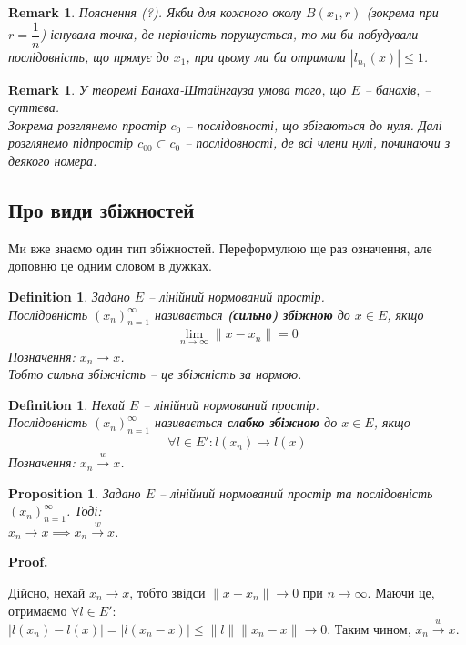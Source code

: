 \documentclass[a4paper, 10pt]{article}
\makeatletter
\theoremstyle{theoremdd}
\theoremstyle{theoremdd}
\newtheorem{definition}[theorem]{Definition}
\theoremstyle{theoremdd}
\theoremstyle{theoremdd}
\theoremstyle{theoremdd}
\newtheorem{proposition}[theorem]{Proposition}
\theoremstyle{theoremdd}
\newtheorem{remark}[theorem]{Remark}
\theoremstyle{theoremdd}
\theoremstyle{theoremdd}
\newcommand{\toweak}{\overset{w}{\to}}
\renewenvironment{proof}[1][Proof.\\]{\par
\pushQED{\hfill \qed}%
\normalfont \topsep6\p@\@plus6\p@\relax
\trivlist
\item\relax
{\bfseries
#1\@addpunct{.}}\hspace\labelsep\ignorespaces
}{%
\popQED\endtrivlist\@endpefalse
}
\makeatother
\begin{document}
\begin{remark}
Пояснення (?). Якби для кожного околу $B(x_1,r)$ (зокрема при $r = \dfrac{1}{n}$) існувала точка, де нерівність порушується, то ми би побудували послідовність, що прямує до $x_1$, при цьому ми би отримали $|l_{n_1}(x)| \leq 1$.
\end{remark}

\begin{remark}
У теоремі Банаха-Штайнгауза умова того, що $E$ -- банахів, -- суттєва.\\
Зокрема розглянемо простір $c_0$ -- послідовності, що збігаються до нуля. Далі розглянемо підпростір $c_{00} \subset c_0$ -- послідовності, де всі члени нулі, починаючи з деякого номера.
\end{remark}

\subsection{Про види збіжностей}
Ми вже знаємо один тип збіжностей. Переформулюю ще раз означення, але доповню це одним словом в дужках.
\begin{definition}
Задано $E$ -- лінійний нормований простір.\\
Послідовність $(x_n)_{n=1}^\infty$ називається \textbf{(сильно) збіжною} до $x \in E$, якщо
\begin{align*}
\lim_{n \to \infty} \|x - x_n\| = 0
\end{align*}
Позначення: $x_n \to x$.\\
Тобто сильна збіжність -- це збіжність за нормою.
\end{definition}

\begin{definition}
Нехай $E$ -- лінійний нормований простір.\\
Послідовність $(x_n)_{n=1}^\infty$ називається \textbf{слабко збіжною} до $x \in E$, якщо
\begin{align*}
\forall l \in E': l(x_n) \to l(x)
\end{align*}
Позначення: $x_n \toweak x$.
\end{definition}

\begin{proposition}
Задано $E$ -- лінійний нормований простір та послідовність $(x_n)_{n=1}^\infty$. Тоді:\\
$x_n \to x \implies x_n \toweak x$.
\end{proposition}

\begin{proof}
Дійсно, нехай $x_n \to x$, тобто звідси $\|x-x_n\| \to 0$ при $n \to \infty$. Маючи це, отримаємо $\forall l \in E'$:\\
$|l(x_n)-l(x)| = |l(x_n-x)| \leq \|l\| \|x_n - x\| \to 0$. Таким чином, $x_n \toweak x$.
\end{proof}
\end{document}
